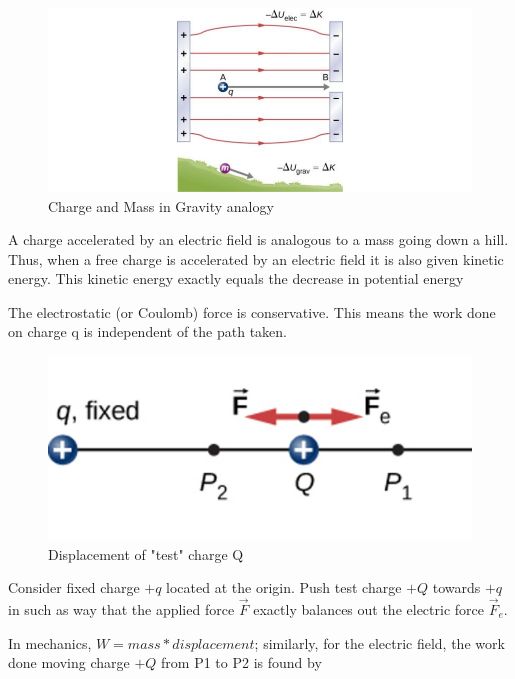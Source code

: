 \documentclass[14pt]{memoir}
\begin{document}
\begin{figure}[H]
\begin{center}
\includegraphics[scale=0.50]{fig/fig_07_02.jpg}
\caption{Charge and Mass in Gravity analogy}
\label{fig:07_02}
\end{center}
\end{figure}

A charge accelerated by an electric field is analogous to a mass going down a hill. Thus, when a free charge is accelerated by an electric field it is also given kinetic energy. This kinetic energy exactly equals the decrease in potential energy

The electrostatic (or Coulomb) force is conservative. This means the work done on charge q is independent of the path taken. 

\begin{figure}[H]
\begin{center}
\includegraphics[scale=0.40]{fig/fig_07_03.jpg}
\caption{Displacement of "test" charge Q}
\label{fig:07_03}
\end{center}
\end{figure}

Consider fixed charge $+q$ located at the origin. Push test charge $+Q$ towards $+q$ in such as way that the applied force $\vec{F}$ exactly balances out the electric force $\vec{F}_e$.

In mechanics, $W = mass * displacement$; similarly, for the electric field, the work done moving charge $+Q$ from P1 to P2 is found by
\end{document}
